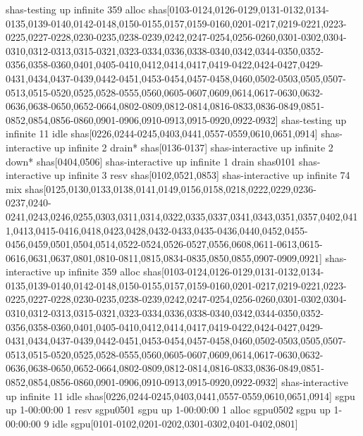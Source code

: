 \documentclass[]{krantz}
\makeatletter
\newenvironment{Shaded}{\begin{snugshade}}{\end{snugshade}}
\newcommand{\ExtensionTok}[1]{#1}
\newcommand{\NormalTok}[1]{#1}
\newenvironment{kframe}{%
\medskip{}
\setlength{\fboxsep}{.8em}
 \def\at@end@of@kframe{}%
 \ifinner\ifhmode%
  \def\at@end@of@kframe{\end{minipage}}%
  \begin{minipage}{\columnwidth}%
 \fi\fi%
 \def\FrameCommand##1{\hskip\@totalleftmargin \hskip-\fboxsep
 \colorbox{shadecolor}{##1}\hskip-\fboxsep
     \hskip-\linewidth \hskip-\@totalleftmargin \hskip\columnwidth}%
 \MakeFramed {\advance\hsize-\width
   \@totalleftmargin\z@ \linewidth\hsize
   \@setminipage}}%
 {\par\unskip\endMakeFramed%
 \at@end@of@kframe}
\renewenvironment{Shaded}{\begin{kframe}}{\end{kframe}}
\makeatother
\begin{document}
\begin{Shaded}
\begin{Highlighting}[]
{\ExtensionTok{shas-testing}\NormalTok{        up   infinite    359  alloc shas[0103-0124,0126-0129,0131-0132,0134-0135,0139-0140,0142-0148,0150-0155,0157,0159-0160,0201-0217,0219-0221,0223-0225,0227-0228,0230-0235,0238-0239,0242,0247-0254,0256-0260,0301-0302,0304-0310,0312-0313,0315-0321,0323-0334,0336,0338-0340,0342,0344-0350,0352-0356,0358-0360,0401,0405-0410,0412,0414,0417,0419-0422,0424-0427,0429-0431,0434,0437-0439,0442-0451,0453-0454,0457-0458,0460,0502-0503,0505,0507-0513,0515-0520,0525,0528-0555,0560,0605-0607,0609,0614,0617-0630,0632-0636,0638-0650,0652-0664,0802-0809,0812-0814,0816-0833,0836-0849,0851-0852,0854,0856-0860,0901-0906,0910-0913,0915-0920,0922-0932]}
\ExtensionTok{shas-testing}\NormalTok{        up   infinite     11   idle shas[0226,0244-0245,0403,0441,0557-0559,0610,0651,0914]}
\ExtensionTok{shas-interactive}\NormalTok{    up   infinite      2 drain* shas[0136-0137]}
\ExtensionTok{shas-interactive}\NormalTok{    up   infinite      2  down* shas[0404,0506]}
\ExtensionTok{shas-interactive}\NormalTok{    up   infinite      1  drain shas0101}
\ExtensionTok{shas-interactive}\NormalTok{    up   infinite      3   resv shas[0102,0521,0853]}
\ExtensionTok{shas-interactive}\NormalTok{    up   infinite     74    mix shas[0125,0130,0133,0138,0141,0149,0156,0158,0218,0222,0229,0236-0237,0240-0241,0243,0246,0255,0303,0311,0314,0322,0335,0337,0341,0343,0351,0357,0402,0411,0413,0415-0416,0418,0423,0428,0432-0433,0435-0436,0440,0452,0455-0456,0459,0501,0504,0514,0522-0524,0526-0527,0556,0608,0611-0613,0615-0616,0631,0637,0801,0810-0811,0815,0834-0835,0850,0855,0907-0909,0921]}
\ExtensionTok{shas-interactive}\NormalTok{    up   infinite    359  alloc shas[0103-0124,0126-0129,0131-0132,0134-0135,0139-0140,0142-0148,0150-0155,0157,0159-0160,0201-0217,0219-0221,0223-0225,0227-0228,0230-0235,0238-0239,0242,0247-0254,0256-0260,0301-0302,0304-0310,0312-0313,0315-0321,0323-0334,0336,0338-0340,0342,0344-0350,0352-0356,0358-0360,0401,0405-0410,0412,0414,0417,0419-0422,0424-0427,0429-0431,0434,0437-0439,0442-0451,0453-0454,0457-0458,0460,0502-0503,0505,0507-0513,0515-0520,0525,0528-0555,0560,0605-0607,0609,0614,0617-0630,0632-0636,0638-0650,0652-0664,0802-0809,0812-0814,0816-0833,0836-0849,0851-0852,0854,0856-0860,0901-0906,0910-0913,0915-0920,0922-0932]}
\ExtensionTok{shas-interactive}\NormalTok{    up   infinite     11   idle shas[0226,0244-0245,0403,0441,0557-0559,0610,0651,0914]}
\ExtensionTok{sgpu}\NormalTok{                up 1-00:00:00      1   resv sgpu0501}
\ExtensionTok{sgpu}\NormalTok{                up 1-00:00:00      1  alloc sgpu0502}
\ExtensionTok{sgpu}\NormalTok{                up 1-00:00:00      9   idle sgpu[0101-0102,0201-0202,0301-0302,0401-0402,0801]}
}
\end{Highlighting}
\end{Shaded}
\end{document}
